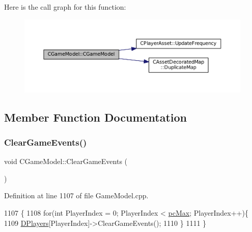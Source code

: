 Here is the call graph for this function\+:\nopagebreak
\begin{figure}[H]
\begin{center}
\leavevmode
\includegraphics[width=350pt]{classCGameModel_a37858821d1294b21b374cf4f81052f3e_cgraph}
\end{center}
\end{figure}


\subsection{Member Function Documentation}
\hypertarget{classCGameModel_a7591a4e79f91a048462bce532fd4eca1}{}\label{classCGameModel_a7591a4e79f91a048462bce532fd4eca1} 
\subsubsection{\texorpdfstring{Clear\+Game\+Events()}{ClearGameEvents()}}
{\footnotesize\ttfamily void C\+Game\+Model\+::\+Clear\+Game\+Events (\begin{DoxyParamCaption}{ }\end{DoxyParamCaption})}



Definition at line 1107 of file Game\+Model.\+cpp.


\begin{DoxyCode}
1107                                 \{
1108     \textcolor{keywordflow}{for}(\textcolor{keywordtype}{int} PlayerIndex = 0; PlayerIndex < \hyperlink{GameDataTypes_8h_aafb0ca75933357ff28a6d7efbdd7602fa594a5c8dd3987f24e8a0f23f1a72cd34}{pcMax}; PlayerIndex++)\{
1109         \hyperlink{classCGameModel_a524436c3560b10e1c6d6fdd0b66565dc}{DPlayers}[PlayerIndex]->ClearGameEvents();
1110     \}
1111 \}
\end{DoxyCode}
\hypertarget{classCGameModel_af27947dce7cc0fa2dc9ec81872e26264}{}\label{classCGameModel_af27947dce7cc0fa2dc9ec81872e26264} 
